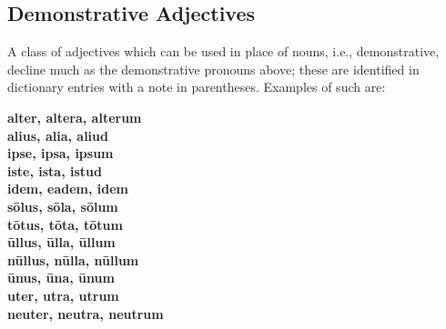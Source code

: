 \subsection{Demonstrative Adjectives}
A class of adjectives which can be used in place of nouns,
i.e., demonstrative, decline much as the demonstrative
pronouns above; these are identified in dictionary entries
with a note in parentheses.  Examples of such are:
\begin{multicols}{3}
  \setlength{\columnseprule}{0pt}
  \textbf{
  alter, altera, alterum \\
  alius, alia, aliud \\
  ipse, ipsa, ipsum \\
  iste, ista, istud \\ \vfill\null\columnbreak
  idem, eadem, idem \\
  s\=olus, s\=ola, s\=olum \\
  t\=otus, t\=ota, t\=otum \\
  \=ullus, \=ulla, \=ullum \\ \vfill\null\columnbreak
  n\=ullus, n\=ulla, n\=ullum \\
  \=unus, \=una, \=unum \\
  uter, utra, utrum \\
  neuter, neutra, neutrum \\ \vfill\null\columnbreak
  }
\end{multicols}
